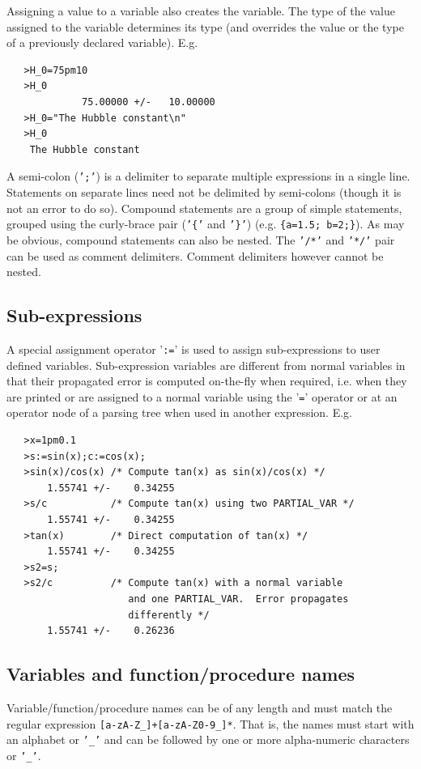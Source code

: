 \documentclass[12pt]{article}
\begin{document}
Assigning a value to a variable also creates the variable.  The type
of the value assigned to the variable determines its type (and overrides
the value or the type of a previously declared variable).  E.g.
\begin{verbatim}
   >H_0=75pm10
   >H_0
             75.00000 +/-   10.00000
   >H_0="The Hubble constant\n"
   >H_0
    The Hubble constant
\end{verbatim}
A semi-colon ({\tt ';'}) is a delimiter to separate multiple
expressions in a single line.  Statements on separate lines need not
be delimited by semi-colons (though it is not an error to do so).
Compound statements are a group of simple statements, grouped using the
curly-brace pair ({\tt '\{'} and {\tt '\}'}) (e.g. {\tt \{a=1.5;
b=2;\}}). As may be obvious, compound statements can also be nested.
The {\tt '/\/*'} and {\tt '*/'} pair can be used as comment
delimiters.  Comment delimiters however cannot be nested. 

\subsection{Sub-expressions}
\label{APPEN:SUBEXPRESSIONS}

A special assignment operator '{\tt :=}' is used to assign
sub-expressions to user defined variables.  Sub-expression variables
are different from normal variables in that their propagated error is
computed on-the-fly when required, i.e.  when they are printed or are
assigned to a normal variable using the '{\tt =}' operator or at an
operator node of a parsing tree when used in another expression.  E.g.
\begin{verbatim}
   >x=1pm0.1
   >s:=sin(x);c:=cos(x);
   >sin(x)/cos(x) /* Compute tan(x) as sin(x)/cos(x) */
       1.55741 +/-    0.34255
   >s/c           /* Compute tan(x) using two PARTIAL_VAR */
       1.55741 +/-    0.34255
   >tan(x)        /* Direct computation of tan(x) */
       1.55741 +/-    0.34255
   >s2=s;
   >s2/c          /* Compute tan(x) with a normal variable
                     and one PARTIAL_VAR.  Error propagates 
                     differently */
       1.55741 +/-    0.26236
\end{verbatim}
\subsection{Variables and function/procedure names}

Variable/function/procedure names can be of any length and must match
the regular expression {\tt [a-zA-Z\_]+[a-zA-Z0-9\_]*}.  That is, the
names must start with an alphabet or {\tt '\_'} and can be followed by
one or more alpha-numeric characters or {\tt '\_'}.
\end{document}
